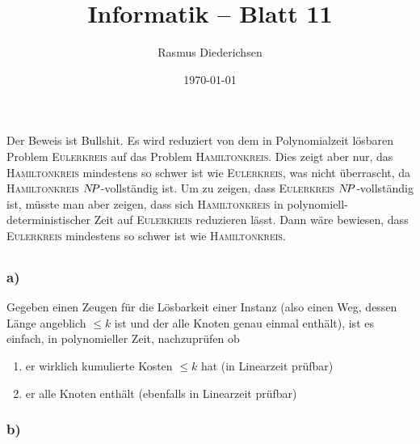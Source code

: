 \documentclass{article}
\title{Informatik \rotatebox[origin=c]{180}{D}\raisebox{2pt}{:} -- Blatt 11}
\author{Rasmus Diederichsen}
\date{\today}
\begin{document}
\maketitle

\section{} 

\subsection{} 

\newcommand{\NP}{N\kern-2ptP}

Der Beweis ist Bullshit. Es wird reduziert von dem in Polynomialzeit lösbaren
Problem \textsc{Eulerkreis} auf das Problem \textsc{Hamiltonkreis}. Dies zeigt
aber nur, das \textsc{Hamiltonkreis} mindestens so schwer ist wie
\textsc{Eulerkreis}, was nicht überrascht, da \textsc{Hamiltonkreis}
$\NP$-vollständig ist. Um zu zeigen, dass
\textsc{Eulerkreis} $\NP$-vollständig ist, müsste man aber zeigen, dass sich
\textsc{Hamiltonkreis} in polynomiell-deterministischer Zeit auf
\textsc{Eulerkreis} reduzieren lässt. Dann wäre bewiesen, dass
\textsc{Eulerkreis} mindestens so schwer ist wie \textsc{Hamiltonkreis}.


\subsection{} 

\subsubsection{a)}

Gegeben einen Zeugen für die Lösbarkeit einer Instanz (also einen Weg, dessen
Länge angeblich $\le k$ ist und der alle Knoten genau einmal enthält), ist es
einfach, in polynomieller Zeit, nachzuprüfen ob 
\begin{enumerate}
   \item er wirklich kumulierte Kosten $\le k$ hat (in Linearzeit prüfbar)
   \item er alle Knoten enthält (ebenfalls in Linearzeit prüfbar)
\end{enumerate}

\subsubsection{b)} 
\end{document}

